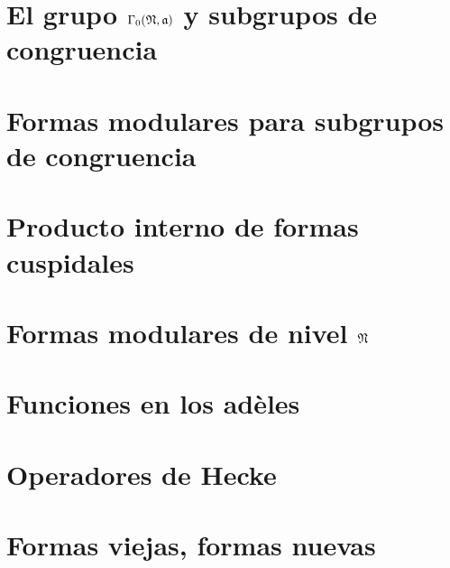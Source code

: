 

\section{El grupo $\Gamma_{0}(\frak{N},\frak{a})$ y subgrupos de %
	congruencia}\label{sec:dehilbertelgrupogamaceroysubgrupos}

\section{Formas modulares para subgrupos de congruencia}%
	\label{sec:dehilbertformasparacongruencia}

\section{Producto interno de formas cuspidales}%
	\label{sec:dehilbertproductodepetersson}

\section{Formas modulares de nivel $\frak{N}$}%
	\label{sec:dehilbertformasmodulares}

\section{Funciones en los ad\`{e}les}%
	\label{sec:dehilbertfuncionesenlosadeles}

\section{Operadores de Hecke}\label{sec:dehilbertoperadoresdehecke}

\section{Formas viejas, formas nuevas}%
	\label{sec:dehilbertformasviejasformasnuevas}


